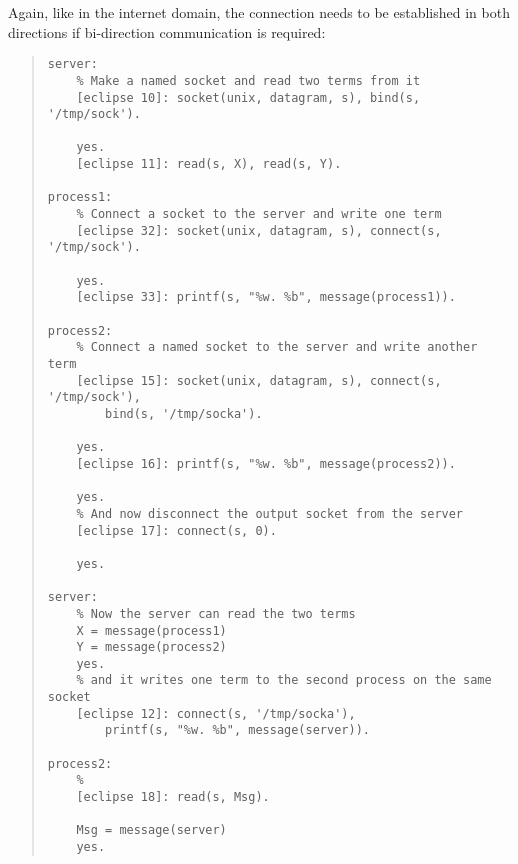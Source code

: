 Again, like in the internet domain, the connection needs to be established
in both directions if bi-direction communication is required:
\begin{quote}
\begin{verbatim}
server:
    % Make a named socket and read two terms from it
    [eclipse 10]: socket(unix, datagram, s), bind(s, '/tmp/sock').

    yes.
    [eclipse 11]: read(s, X), read(s, Y).

process1:
    % Connect a socket to the server and write one term
    [eclipse 32]: socket(unix, datagram, s), connect(s, '/tmp/sock').

    yes.
    [eclipse 33]: printf(s, "%w. %b", message(process1)).

process2:
    % Connect a named socket to the server and write another term
    [eclipse 15]: socket(unix, datagram, s), connect(s, '/tmp/sock'),
        bind(s, '/tmp/socka').

    yes.
    [eclipse 16]: printf(s, "%w. %b", message(process2)).

    yes.
    % And now disconnect the output socket from the server
    [eclipse 17]: connect(s, 0).

    yes.

server:
    % Now the server can read the two terms
    X = message(process1)
    Y = message(process2)
    yes.
    % and it writes one term to the second process on the same socket
    [eclipse 12]: connect(s, '/tmp/socka'),
        printf(s, "%w. %b", message(server)).

process2:
    % 
    [eclipse 18]: read(s, Msg).

    Msg = message(server)
    yes.
\end{verbatim}
\end{quote}

